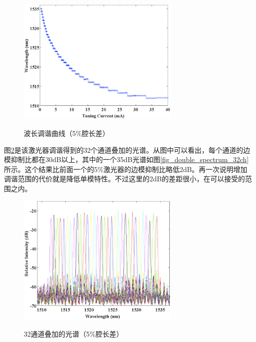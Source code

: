 \documentclass{ZJUthesis}
\begin{document}
\begin{figure}[!ht]
  \centering
  \includegraphics[width=0.7\textwidth]{./Pictures/double_tuning_32ch.eps}\\
  \caption{波长调谐曲线（5\%腔长差）}
  \label{fig_double_tuning_32ch}
\end{figure}

图\ref{fig_double_spectra_32ch}是该激光器调谐得到的32个通道叠加的光谱。从图中可以看出，每个通道的边模抑制比都在30dB以上，其中的一个35dB光谱如图\ref{fig_double_spectrum_32ch}所示。这个结果比前面一个的5\%激光器的边模抑制比略低2dB。再一次说明增加调谐范围的代价就是降低单模特性。不过这里的2dB的差距很小，在可以接受的范围之内。

\begin{figure}[!ht]
  \centering
  \includegraphics[width=0.7\textwidth]{./Pictures/double_spectra_32ch.eps}\\
  \caption{32通道叠加的光谱（5\%腔长差）}
  \label{fig_double_spectra_32ch}
\end{figure}
\end{document}
